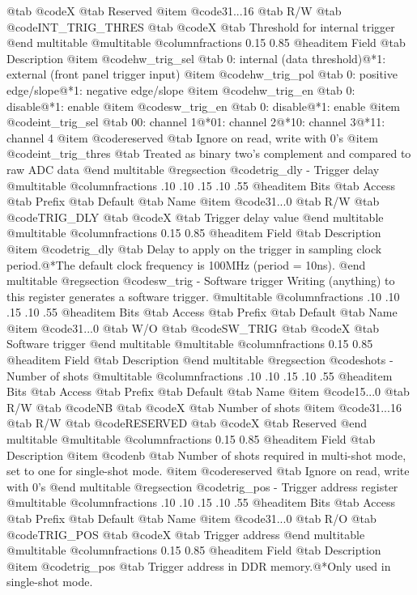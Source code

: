 @tab @code{X} @tab 
Reserved
@item @code{31...16}
@tab R/W @tab
@code{INT_TRIG_THRES}
@tab @code{X} @tab 
Threshold for internal trigger
@end multitable
@multitable @columnfractions 0.15 0.85
@headitem Field @tab Description
@item @code{hw_trig_sel} @tab 0: internal (data threshold)@*1: external (front panel trigger input)
@item @code{hw_trig_pol} @tab 0: positive edge/slope@*1: negative edge/slope
@item @code{hw_trig_en} @tab 0: disable@*1: enable
@item @code{sw_trig_en} @tab 0: disable@*1: enable
@item @code{int_trig_sel} @tab 00: channel 1@*01: channel 2@*10: channel 3@*11: channel 4
@item @code{reserved} @tab Ignore on read, write with 0's
@item @code{int_trig_thres} @tab Treated as binary two's complement and compared to raw ADC data
@end multitable
@regsection @code{trig_dly} - Trigger delay
@multitable @columnfractions .10 .10 .15 .10 .55
@headitem Bits @tab Access @tab Prefix @tab Default @tab Name
@item @code{31...0}
@tab R/W @tab
@code{TRIG_DLY}
@tab @code{X} @tab 
Trigger delay value
@end multitable
@multitable @columnfractions 0.15 0.85
@headitem Field @tab Description
@item @code{trig_dly} @tab Delay to apply on the trigger in sampling clock period.@*The default clock frequency is 100MHz (period = 10ns).
@end multitable
@regsection @code{sw_trig} - Software trigger
Writing (anything) to this register generates a software trigger.
@multitable @columnfractions .10 .10 .15 .10 .55
@headitem Bits @tab Access @tab Prefix @tab Default @tab Name
@item @code{31...0}
@tab W/O @tab
@code{SW_TRIG}
@tab @code{X} @tab 
Software trigger
@end multitable
@multitable @columnfractions 0.15 0.85
@headitem Field @tab Description
@end multitable
@regsection @code{shots} - Number of shots
@multitable @columnfractions .10 .10 .15 .10 .55
@headitem Bits @tab Access @tab Prefix @tab Default @tab Name
@item @code{15...0}
@tab R/W @tab
@code{NB}
@tab @code{X} @tab 
Number of shots
@item @code{31...16}
@tab R/W @tab
@code{RESERVED}
@tab @code{X} @tab 
Reserved
@end multitable
@multitable @columnfractions 0.15 0.85
@headitem Field @tab Description
@item @code{nb} @tab Number of shots required in multi-shot mode, set to one for single-shot mode.
@item @code{reserved} @tab Ignore on read, write with 0's
@end multitable
@regsection @code{trig_pos} - Trigger address register
@multitable @columnfractions .10 .10 .15 .10 .55
@headitem Bits @tab Access @tab Prefix @tab Default @tab Name
@item @code{31...0}
@tab R/O @tab
@code{TRIG_POS}
@tab @code{X} @tab 
Trigger address
@end multitable
@multitable @columnfractions 0.15 0.85
@headitem Field @tab Description
@item @code{trig_pos} @tab Trigger address in DDR memory.@*Only used in single-shot mode.
